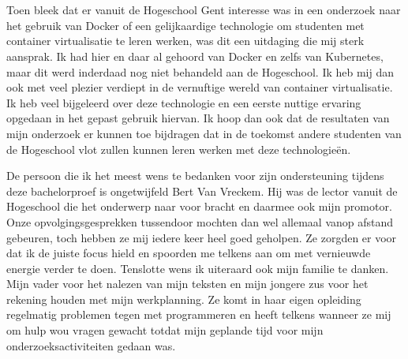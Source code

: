 
\chapter*{}
\label{ch:voorwoord}


Toen bleek dat er vanuit de Hogeschool Gent interesse was in een onderzoek naar het gebruik van Docker of een gelijkaardige technologie om studenten met container virtualisatie te leren werken, was dit een uitdaging die mij sterk aansprak. Ik had hier en daar al gehoord van Docker en zelfs van Kubernetes, maar dit werd inderdaad nog niet behandeld aan de Hogeschool. Ik heb mij dan ook met veel plezier verdiept in de vernuftige wereld van container virtualisatie. Ik heb veel bijgeleerd over deze technologie en een eerste nuttige ervaring opgedaan in het gepast gebruik hiervan. Ik hoop dan ook dat de resultaten van mijn onderzoek er kunnen toe bijdragen dat in de toekomst andere studenten van de Hogeschool vlot zullen kunnen leren werken met deze technologieën. 

De persoon die ik het meest wens te bedanken voor zijn ondersteuning tijdens deze bachelorproef is ongetwijfeld Bert Van Vreckem. Hij was de lector vanuit de Hogeschool die het onderwerp naar voor bracht en daarmee ook mijn promotor. Onze opvolgingsgesprekken tussendoor mochten dan wel allemaal vanop afstand gebeuren, toch hebben ze mij iedere keer heel goed geholpen. Ze zorgden er voor dat ik de juiste focus hield en spoorden me telkens aan om met vernieuwde energie verder te doen. Tenslotte wens ik uiteraard ook mijn familie te danken. Mijn vader voor het nalezen van mijn teksten en mijn jongere zus voor het rekening houden met mijn werkplanning. Ze komt in haar eigen opleiding regelmatig problemen tegen met programmeren en heeft telkens wanneer ze mij om hulp wou vragen gewacht totdat mijn geplande tijd voor mijn onderzoeksactiviteiten gedaan was.